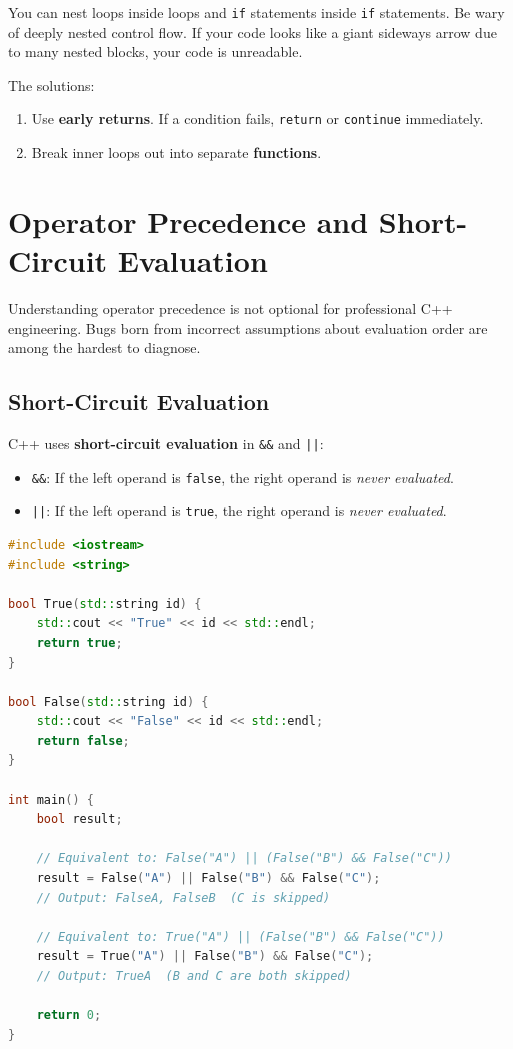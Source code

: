 You can nest loops inside loops and \texttt{if} statements inside \texttt{if} statements. Be wary of deeply nested control flow. If your code looks like a giant sideways arrow due to many nested blocks, your code is unreadable.

The solutions:
\begin{enumerate}
    \item Use \textbf{early returns}. If a condition fails, \texttt{return} or \texttt{continue} immediately.
    \item Break inner loops out into separate \textbf{functions}.
\end{enumerate}

\section{Operator Precedence and Short-Circuit Evaluation}
\label{sec:operator-precedence}

Understanding operator precedence is not optional for professional C++ engineering. Bugs born from incorrect assumptions about evaluation order are among the hardest to diagnose.

\subsection{Short-Circuit Evaluation}

C++ uses \textbf{short-circuit evaluation} in \texttt{\&\&} and \texttt{||}:
\begin{itemize}
    \item \texttt{\&\&}: If the left operand is \texttt{false}, the right operand is \textit{never evaluated}.
    \item \texttt{||}: If the left operand is \texttt{true}, the right operand is \textit{never evaluated}.
\end{itemize}

\begin{lstlisting}[language=C++, caption={Short-circuit evaluation and precedence}]
#include <iostream>
#include <string>

bool True(std::string id) {
    std::cout << "True" << id << std::endl;
    return true;
}

bool False(std::string id) {
    std::cout << "False" << id << std::endl;
    return false;
}

int main() {
    bool result;

    // Equivalent to: False("A") || (False("B") && False("C"))
    result = False("A") || False("B") && False("C");
    // Output: FalseA, FalseB  (C is skipped)

    // Equivalent to: True("A") || (False("B") && False("C"))
    result = True("A") || False("B") && False("C");
    // Output: TrueA  (B and C are both skipped)

    return 0;
}
\end{lstlisting}

